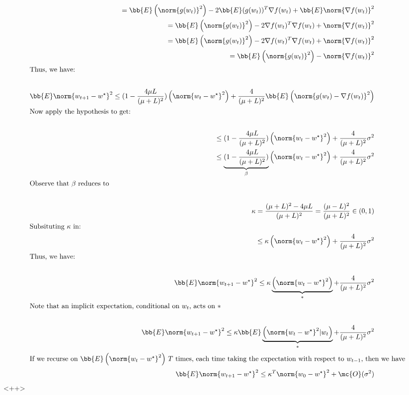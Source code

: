 \documentclass[../main.tex]{subfiles}
\begin{document}
\begin{align*}
     = \bb{E}\left( \norm{g(w_t)}^2\right) - 2\bb{E}(g(w_t))^T\nabla f(w_t) + \bb{E}\norm{\nabla f(w_t)}^2  \\
     = \bb{E}\left( \norm{g(w_t)}^2\right) - 2\nabla f(w_t)^T\nabla f(w_t) + \norm{\nabla f(w_t)}^2  \\
     = \bb{E}\left( \norm{g(w_t)}^2\right) - 2\nabla f(w_t)^T\nabla f(w_t) + \norm{\nabla f(w_t)}^2  \\
     = \bb{E}\left( \norm{g(w_t)}^2\right) - \norm{\nabla f(w_t)}^2  \\
     \intertext{Thus, we have:} \\
     \bb{E} \norm{w_{t+1} - w^{\star}}^2 \leq (1 - \frac{4\mu L }{(\mu + L)^2})\left( \norm{w_{t} - w^{\star}}^2 \right) + \frac{4}{(\mu + L)^2}\bb{E}\left(\norm{g(w_t) - \nabla f(w_t)}^2\right)  \\
     \intertext{Now apply the hypothesis to get:} \\
     \leq (1 - \frac{4\mu L }{(\mu + L)^2})\left( \norm{w_{t} - w^{\star}}^2 \right) + \frac{4}{(\mu + L)^2}\sigma^2  \\
     \leq \underbrace{(1 - \frac{4\mu L }{(\mu + L)^2})}_{\beta}\left( \norm{w_{t} - w^{\star}}^2 \right) + \frac{4}{(\mu + L)^2}\sigma^2  \\
     \intertext{Observe that $\beta$ reduces to} \\
     \kappa = \frac{(\mu + L)^2 - 4\mu L }{(\mu + L)^2} = \frac{(\mu - L)^2 }{(\mu + L)^2} \in (0,1) \\
     \intertext{Subsituting $\kappa$ in:}
     \leq \kappa \left( \norm{w_{t} - w^{\star}}^2 \right) + \frac{4}{(\mu + L)^2}\sigma^2  \\
     \intertext{Thus, we have:} \\
     \bb{E} \norm{w_{t+1} - w^{\star}}^2 \leq \kappa \underbrace{\left( \norm{w_{t} - w^{\star}}^2 \right)}_{\ast} + \frac{4}{(\mu + L)^2}\sigma^2  \\
     \intertext{Note that an implicit expectation, conditional on $w_{t}$, acts on $\ast$} \\
     \bb{E} \norm{w_{t+1} - w^{\star}}^2 \leq \kappa \bb{E}\underbrace{\left( \norm{w_{t} - w^{\star}}^2 | w_{t} \right)}_{\ast} + \frac{4}{(\mu + L)^2}\sigma^2  \\
     \intertext{If we recurse on $\bb{E}\left(\norm{w_t - w^{\star}}^2\right)$ $T$ times, each time taking the expectation with respect to $w_{t-1}$, then we have}
     \bb{E} \norm{w_{t+1} - w^{\star}}^2 \leq \kappa^T \norm{w_{0} - w^{\star}}^2+ \mc{O}(\sigma^2)  \\
\end{align*}<++>



\newpage \nocite{*}


\end{document}
